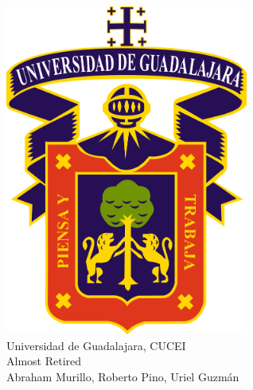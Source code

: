 \documentclass{article} %
\begin{document}
  

\pagestyle{empty}
  \begin{center}
    \strut %
    \includegraphics[width=8cm]{udg.png} \\
    {\Huge Universidad de Guadalajara, CUCEI\\}
    {\fontsize{60}{60}\selectfont Almost Retired\\}
    \vspace{0.5cm}
    {\Large Abraham Murillo, Roberto Pino, Uriel Guzmán\\}
    \vfill
    \vspace{0.5cm}
    \vspace{1cm}
  \end{center}
\clearpage
\pagestyle{fancy}
  
\end{document}
